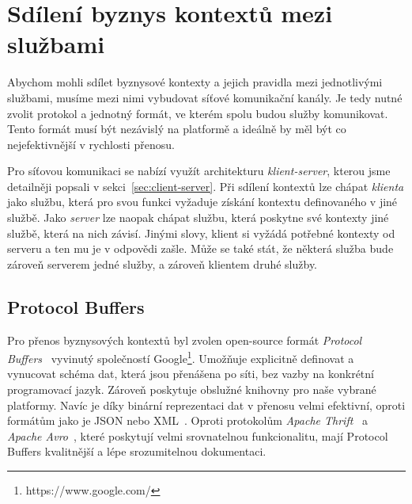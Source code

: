 \section{Sdílení byznys kontextů mezi službami}

Abychom mohli sdílet byznysové kontexty a jejich pravidla
mezi jednotlivými službami, musíme mezi nimi vybudovat
síťové komunikační kanály. Je tedy nutné zvolit protokol
a jednotný formát, ve kterém spolu budou služby komunikovat.
Tento formát musí být nezávislý na platformě a ideálně
by měl být co nejefektivnější v rychlosti přenosu.

Pro síťovou komunikaci se nabízí využít architekturu
\textit{klient-server}, kterou jsme detailněji popsali
v sekci~\ref{sec:client-server}. Při sdílení kontextů
lze chápat \textit{klienta} jako službu, která pro svou funkci
vyžaduje získání kontextu definovaného v jiné službě.
Jako \textit{server} lze naopak chápat službu, která poskytne
své kontexty jiné službě, která na nich závisí. Jinými slovy,
klient si vyžádá potřebné kontexty od serveru a ten mu je v
odpovědi zašle. Může se také stát, že některá služba bude zároveň
serverem jedné služby, a zároveň klientem druhé služby.

\subsection{Protocol Buffers}

Pro přenos byznysových kontextů byl zvolen open-source formát
\textit{Protocol Buffers}~\cite{protobuf}\cite{varda2008protocol}
vyvinutý společností Google\footnote{https://www.google.com/}.
Umožňuje explicitně definovat a vynucovat schéma dat,
která jsou přenášena po síti, bez vazby na konkrétní programovací
jazyk. Zároveň poskytuje obslužné knihovny pro naše vybrané platformy.
Navíc je díky binární reprezentaci dat v přenosu velmi efektivní,
oproti formátům jako je JSON nebo XML~\cite{maeda2012performance}.
Oproti protokolům \textit{Apache Thrift}~\cite{thrift}
a \textit{Apache Avro}~\cite{avro}, které poskytují
velmi srovnatelnou funkcionalitu, mají Protocol Buffers
kvalitnější a lépe srozumitelnou dokumentaci.



